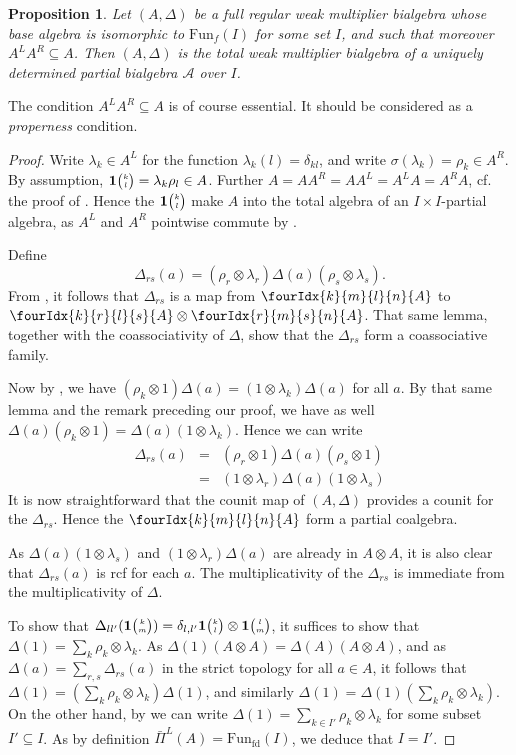 \documentclass[10pt]{article}
\DeclareMathOperator{\fin}{\mathrm{fd}}
\newcommand{\Fun}{\mathrm{Fun}}
\newcommand{\Grt}[3]{#1{\tiny {\begin{pmatrix} #2\\#3\end{pmatrix}}}}
\newcommand{\UnitC}[2]{\Grt{\mathbf{1}}{#1}{#2}}
\newcommand{\Gr}[5]{\fourIdx{#2}{#4}{#3}{#5}{#1}}%
\newtheorem{Prop}[Theorem]{Proposition}
\theoremstyle{definition}
\numberwithin{equation}{section}
\begin{document}
\begin{Prop}\label{PropCharPBA} Let $(A,\Delta)$ be a full regular weak multiplier bialgebra whose base algebra is isomorphic to $\Fun_f(I)$ for some set $I$, and such that moreover $A^LA^R \subseteq A$. Then $(A,\Delta)$ is the total weak multiplier bialgebra of a uniquely determined partial bialgebra $\mathscr{A}$ over $I$.
\end{Prop} 

The condition $A^LA^R \subseteq A$ is of course essential. It should be considered as a \emph{properness} condition. %


\begin{proof} Write $\lambda_k \in A^L$ for the function $\lambda_k(l) = \delta_{kl}$, and write $\sigma(\lambda_k) = \rho_k\in A^R$. By assumption, $\UnitC{k}{l} = \lambda_k\rho_l\in A$. Further $A= AA^R = AA^L = A^LA=A^RA$, cf.~ the proof of \cite[Theorem 3.13]{Boh1}. Hence the $\UnitC{k}{l}$ make $A$ into the total algebra of an $I\times I$-partial algebra, as $A^L$ and $A^R$ pointwise commute by \cite[Lemma 3.5]{Boh1}. 

Define \[\Delta_{rs}(a) = (\rho_r\otimes \lambda_r)\Delta(a)(\rho_s\otimes \lambda_s).\] From \cite[Lemma 3.3]{Boh1}, it follows that $\Delta_{rs}$ is a map from $\Gr{A}{k}{l}{m}{n}$ to $\Gr{A}{k}{l}{r}{s}\otimes \Gr{A}{r}{s}{m}{n}$. That same lemma, together with the coassociativity of $\Delta$, show that the $\Delta_{rs}$ form a coassociative family.  

Now by \cite[Lemma 3.9]{Boh1}, we have $(\rho_k\otimes 1)\Delta(a) = (1\otimes \lambda_k)\Delta(a)$ for all $a$. By that same lemma and the remark preceding our proof, we have as well $\Delta(a)(\rho_k\otimes 1) = \Delta(a)(1\otimes \lambda_k)$. Hence we can write \begin{eqnarray*} \Delta_{rs}(a) &=& (\rho_r\otimes 1)\Delta(a)(\rho_s\otimes 1) \\ &=& (1\otimes \lambda_r)\Delta(a)(1\otimes \lambda_s)\end{eqnarray*}  It is now straightforward that the counit map of $(A,\Delta)$ provides a counit for the $\Delta_{rs}$. Hence the $\Gr{A}{k}{l}{m}{n}$ form a partial coalgebra. 

As $\Delta(a)(1\otimes \lambda_s)$ and $(1\otimes \lambda_r)\Delta(a)$ are already in $A\otimes A$, it is also clear that $\Delta_{rs}(a)$ is rcf for each $a$. The multiplicativity of the $\Delta_{rs}$ is immediate from the multiplicativity of $\Delta$.

To show that $\Delta_{ll'}(\UnitC{k}{m}) = \delta_{l,l'} \UnitC{k}{l}\otimes \UnitC{l}{m}$, it suffices to show that $\Delta(1) = \sum_k \rho_k\otimes \lambda_k$. As $\Delta(1)(A\otimes A)  = \Delta(A)(A\otimes A)$, and as $\Delta(a) = \sum_{r,s}\Delta_{rs}(a)$ in the strict topology for all $a\in A$, it follows that $\Delta(1) = \left(\sum_k \rho_k\otimes \lambda_k\right)\Delta(1)$, and similarly $\Delta(1) = \Delta(1)\left(\sum_k\rho_k\otimes \lambda_k\right)$. On the other hand, by \cite[Lemma 4.10]{Boh1} we can write $\Delta(1)=\sum_{k\in I'} \rho_k\otimes \lambda_k$ for some subset $I'\subseteq I$. As by definition $\bar{\Pi}^L(A) = \Fun_{\fin}(I)$, we deduce that $I=I'$. 


\end{proof}
\end{document}
